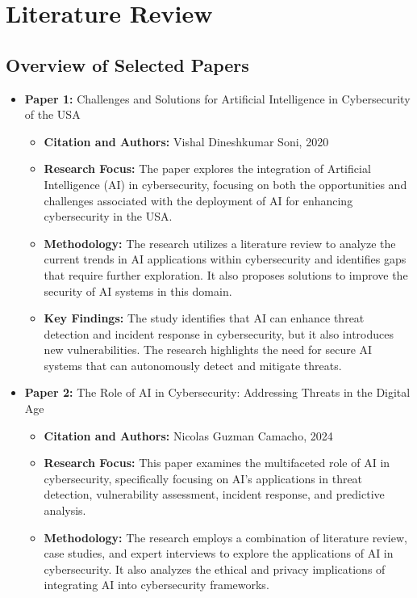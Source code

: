 \documentclass{article}  %
\begin{document}

\section{Literature Review}

\subsection{Overview of Selected Papers}
\begin{itemize}
    \item \textbf{Paper 1:} Challenges and Solutions for Artificial Intelligence in Cybersecurity of the USA
    \begin{itemize}
        \item \textbf{Citation and Authors:} Vishal Dineshkumar Soni, 2020
        \item \textbf{Research Focus:} The paper explores the integration of Artificial Intelligence (AI) in cybersecurity, focusing on both the opportunities and challenges associated with the deployment of AI for enhancing cybersecurity in the USA.
        \item \textbf{Methodology:} The research utilizes a literature review to analyze the current trends in AI applications within cybersecurity and identifies gaps that require further exploration. It also proposes solutions to improve the security of AI systems in this domain.
        \item \textbf{Key Findings:} The study identifies that AI can enhance threat detection and incident response in cybersecurity, but it also introduces new vulnerabilities. The research highlights the need for secure AI systems that can autonomously detect and mitigate threats.
    \end{itemize}
    \vspace{0.2cm}
    \item \textbf{Paper 2:} The Role of AI in Cybersecurity: Addressing Threats in the Digital Age
    \begin{itemize}
        \item \textbf{Citation and Authors:} Nicolas Guzman Camacho, 2024
        \item \textbf{Research Focus:} This paper examines the multifaceted role of AI in cybersecurity, specifically focusing on AI’s applications in threat detection, vulnerability assessment, incident response, and predictive analysis.
        \item \textbf{Methodology:} The research employs a combination of literature review, case studies, and expert interviews to explore the applications of AI in cybersecurity. It also analyzes the ethical and privacy implications of integrating AI into cybersecurity frameworks.

\end{itemize}
\end{itemize}
\end{document}
